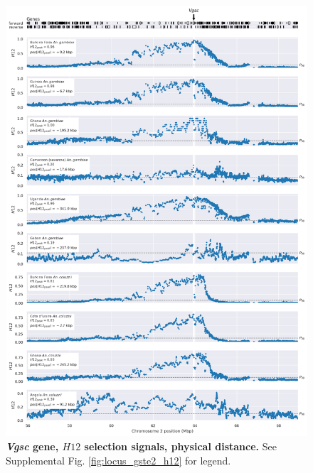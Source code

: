 \documentclass[a4paper,11pt,abstracton,hidelinks]{scrartcl}
\begin{document}
\begin{figure}[t!]
	\begin{center}
		\includegraphics*[width=1\linewidth,center]{artwork/locus_vgsc_h12_pdist.png}
	\end{center}
	\caption[\textit{Vgsc} gene, $H12$ selection signals, physical distance]{
	\textbf{\textit{Vgsc} gene, $H12$ selection signals, physical distance.}
	See Supplemental Fig. \ref{fig:locus_gste2_h12} for legend.
	} 
	\label{fig:locus_vgsc_h12}
\end{figure}


\clearpage
\end{document}
